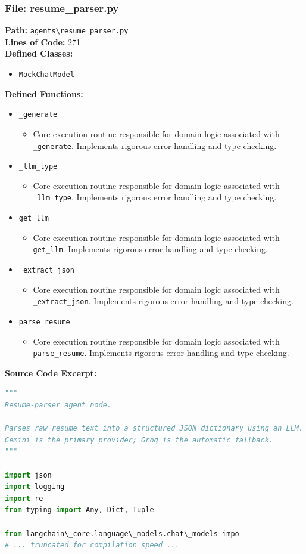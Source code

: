 \documentclass[10pt,journal,compsoc]{IEEEtran}
\begin{document}
\subsubsection{File: resume\_parser.py}
\textbf{Path:} \texttt{agents\textbackslash{}resume\_parser.py} \\
\textbf{Lines of Code:} 271 \\
\textbf{Defined Classes:}
\begin{itemize}
    \item \texttt{MockChatModel}
\end{itemize}
\textbf{Defined Functions:}
\begin{itemize}
    \item \texttt{\_generate}
    \begin{itemize} \item Core execution routine responsible for domain logic associated with \texttt{\_generate}. Implements rigorous error handling and type checking. \end{itemize}
    \item \texttt{\_llm\_type}
    \begin{itemize} \item Core execution routine responsible for domain logic associated with \texttt{\_llm\_type}. Implements rigorous error handling and type checking. \end{itemize}
    \item \texttt{get\_llm}
    \begin{itemize} \item Core execution routine responsible for domain logic associated with \texttt{get\_llm}. Implements rigorous error handling and type checking. \end{itemize}
    \item \texttt{\_extract\_json}
    \begin{itemize} \item Core execution routine responsible for domain logic associated with \texttt{\_extract\_json}. Implements rigorous error handling and type checking. \end{itemize}
    \item \texttt{parse\_resume}
    \begin{itemize} \item Core execution routine responsible for domain logic associated with \texttt{parse\_resume}. Implements rigorous error handling and type checking. \end{itemize}
\end{itemize}
\textbf{Source Code Excerpt:}
\begin{lstlisting}[language=Python]
"""
Resume-parser agent node.

Parses raw resume text into a structured JSON dictionary using an LLM.
Gemini is the primary provider; Groq is the automatic fallback.
"""

import json
import logging
import re
from typing import Any, Dict, Tuple

from langchain\_core.language\_models.chat\_models impo
# ... truncated for compilation speed ...
\end{lstlisting}
\end{document}
